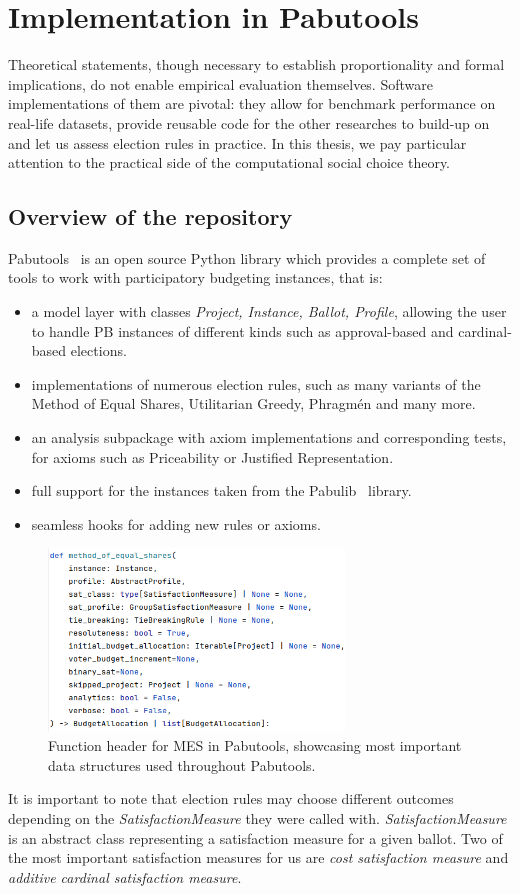 \chapter{Implementation in Pabutools}\label{chap:3}
Theoretical statements, though necessary to establish proportionality and formal implications, do not enable empirical evaluation themselves. Software implementations of them are pivotal: they allow for benchmark performance on real-life datasets, provide reusable code for the other researches to build-up on and let us assess election rules in practice. In this thesis, we pay particular attention to the practical side of the computational social choice theory.
\section{Overview of the repository}
Pabutools~\cite{Pabutools} is an open source Python library which provides a complete set of tools to work with participatory budgeting instances, that is:
\begin{itemize}
    \item a model layer with classes \emph{Project, Instance, Ballot, Profile}, allowing the user to handle PB instances of different kinds such as approval-based and cardinal-based elections.
    \item implementations of numerous election rules, such as many variants of the Method of Equal Shares, Utilitarian Greedy, Phragmén and many more.
    \item an analysis subpackage with axiom implementations and corresponding tests, for axioms such as Priceability or Justified Representation.
    \item full support for the instances taken from the Pabulib~\cite{Pabulib} library.
    \item seamless hooks for adding new rules or axioms.
\end{itemize}
\begin{figure}[H]         
  \centering              
  \includegraphics[width=0.7\textwidth]{figures/MES_method_pabutools.png}
  \caption{Function header for MES in Pabutools, showcasing most important data structures used throughout Pabutools.}
  \label{fig:myplot}
\end{figure}
It is important to note that election rules may choose different outcomes depending on the \emph{SatisfactionMeasure} they were called with. \emph{SatisfactionMeasure} is an abstract class representing a satisfaction measure for a given ballot. Two of the most important satisfaction measures for us are \emph{cost satisfaction measure} and \emph{additive cardinal satisfaction measure}.
